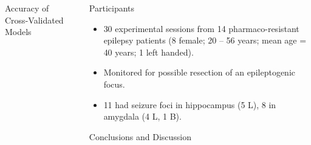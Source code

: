\documentclass[final,20pt]{beamer}
\newlength{\sepwidth}
\newlength{\colwidth}
\newlength{\colwidthbig}
\newlength{\colwidthsmall}
\newcommand{\separatorcolumn}{\begin{column}{\sepwidth}\end{column}}
\begin{document}
\begin{frame}[t]
\begin{columns}[t]
\begin{column}{\colwidthbig}
\begin{block}{Accuracy of Cross-Validated Models}
    
    
  \end{block}

\end{column}

\separatorcolumn

\begin{column}{\colwidthsmall}

  \begin{block}{Participants}
    
    \begin{itemize}
        \item 30 experimental sessions from 14 pharmaco-resistant epilepsy patients (8 female; 20 -- 56 years; mean age = 40 years; 1 left handed). 
        \item Monitored for possible resection of an epileptogenic focus.
        \item 11 had seizure foci in hippocampus (5 L), 8 in amygdala (4 L, 1 B). 
    \end{itemize}
    

  \end{block}

  \begin{block}{Conclusions and Discussion}
    

\end{block}
\end{column}
\end{columns}
\end{frame}
\end{document}
